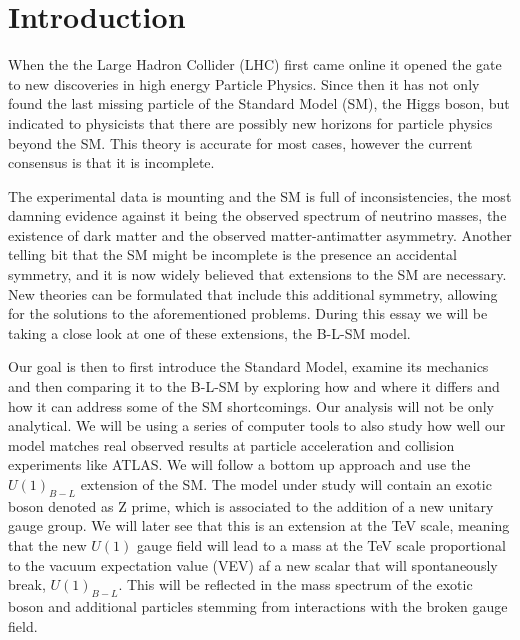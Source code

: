 \documentclass[12pt]{article}
\begin{document}
\cleardoublepage
\listoffigures

\cleardoublepage
\listoftables

\cleardoublepage

\section{Introduction} 
\setcounter{page}{1}

When the the Large Hadron Collider (LHC) first came online it opened the gate to new discoveries in high energy Particle Physics.
%
Since then it has not only found the last missing particle of the Standard Model (SM), the Higgs boson, but indicated to physicists that there are possibly new horizons for particle physics beyond the SM. 
%
This theory is accurate for most cases, however the current consensus is that it is incomplete. 
%

The experimental data is mounting and the SM is full of inconsistencies,  the most damning evidence against it being the observed spectrum of neutrino masses, the existence of dark matter and the observed matter-antimatter asymmetry.
%
Another telling bit that the SM might be incomplete is the presence an accidental symmetry, and it is now widely believed that extensions to the SM are necessary. 
%
New theories can be formulated that include this additional symmetry, allowing for the solutions to the aforementioned problems.
%
During this essay we will be taking a close look at one of these extensions, the B-L-SM model.

Our goal is then to first introduce the Standard Model, examine its mechanics and then comparing it to the B-L-SM by exploring how and where it differs and how it can address some of the SM shortcomings.  
%
Our analysis will not be only analytical. We will be using a series of computer tools to also study how well our model matches real observed results at particle acceleration and collision experiments like ATLAS.
%
We will follow a bottom up approach and use the $U(1)_{B-L}$ extension of the SM.
%
The model under study will contain an exotic boson denoted as Z prime, which is associated to the addition of a new unitary gauge group.
%
We will later see that this is an extension at the TeV scale, meaning that the new  $U(1)$ gauge field will lead to a mass at the TeV scale proportional to the vacuum expectation value (VEV) af a new scalar that will spontaneously break, $U(1)_{B-L}$. This will be reflected in the mass spectrum of the exotic boson and additional particles stemming from interactions with the broken gauge field.  
\end{document}
